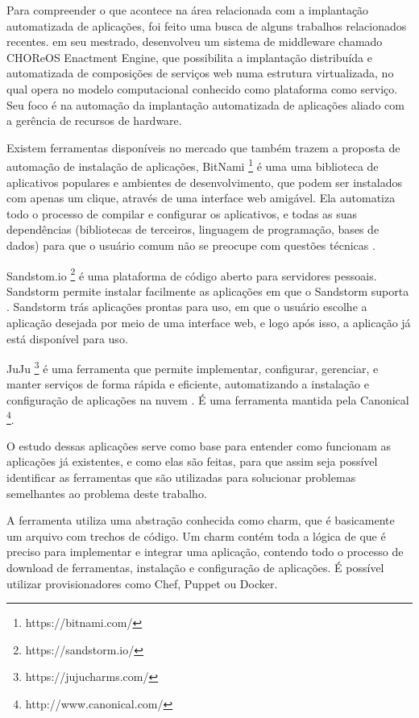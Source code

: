 Para compreender o que acontece na área relacionada com a implantação
automatizada de aplicações, foi feito uma busca de alguns trabalhos relacionados 
recentes.  em seu mestrado,
desenvolveu um sistema de middleware chamado CHOReOS Enactment Engine, que possibilita a implantação distribuída e automatizada de composições
de serviços web numa estrutura virtualizada, no qual opera no modelo
computacional conhecido como plataforma como serviço. Seu foco é na automação da 
implantação automatizada de aplicações aliado com a gerência de recursos de 
hardware.

Existem ferramentas disponíveis no mercado que também trazem a proposta
de automação de instalação de aplicações, BitNami \footnote{https://bitnami.com/} é uma 
uma biblioteca de aplicativos populares e ambientes de desenvolvimento, 
que podem ser instalados com apenas um clique, 
através de uma interface web amigável. Ela automatiza todo o processo de 
compilar e configurar os aplicativos, 
e todas as suas dependências (bibliotecas de terceiros, linguagem de programação, 
bases de dados) para que o usuário comum não se preocupe com questões técnicas . 

Sandstom.io \footnote{https://sandstorm.io/} é uma plataforma de código aberto para servidores
pessoais. Sandstorm permite instalar
facilmente as aplicações em que o Sandstorm 
suporta \cite{sandstormio}. Sandstorm trás aplicações prontas para uso, 
em que o usuário escolhe a aplicação desejada  por meio de uma interface web, 
e logo após isso, a aplicação já está disponível para uso.

JuJu \footnote{https://jujucharms.com/} é uma ferramenta que permite 
implementar, configurar, gerenciar, 
e manter serviços de forma rápida e eficiente, automatizando a instalação e 
configuração de aplicações na nuvem \cite{juju}. É uma ferramenta mantida pela Canonical \footnote{http://www.canonical.com/}. 

O estudo dessas aplicações serve como base para entender como funcionam as aplicações
já existentes, e como elas são feitas, para que assim seja possível identificar
as ferramentas que são utilizadas para solucionar problemas semelhantes ao problema deste
trabalho. 

A ferramenta  utiliza uma abstração conhecida como charm,
que é basicamente um arquivo com trechos de código. Um charm
contém toda a lógica de que é preciso para implementar e integrar uma aplicação,
contendo todo o processo de download de ferramentas, instalação e configuração de
aplicações. É possível utilizar provisionadores como Chef, Puppet ou Docker. 

